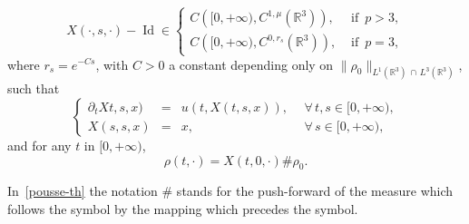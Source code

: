 \documentclass[AHL,Unicode,longabstracts,published]{cedram}
\newcommand{\R}{\mathbb{R}}
\newcommand{\Id}{\operatorname{Id}}
\let\oldforall\forall
\renewcommand*{\forall}{\mathrel{\oldforall}}
\begin{document}
\begin{theo}
\begin{equation}\label{uflox}
X(\cdot,s,\cdot)-\Id \in
\begin{cases}
C\left([0,+\infty), C^{1,\mu} \left(\R^3\right)\right), & \text{ if } \, p > 3,
\\ {C\left([0,+\infty), C^{0,r_s} \left(\R^3\right)\right),} & \text{ if } \, p =3,
\end{cases}
\end{equation}
where $r_s = e^{-Cs} $, with $C>0$ a constant depending only on $\|\rho_0\|_{L^1(\R^3)\,\cap\,L^3(\R^3)}$, such that
\begin{equation}\label{cflow-def}
\left \{
\begin{array}{rcll}
\partial_t Xt,s,x) & = & u(t, X(t,s,x)),&\: \: \forall \, t,s\in[0,+\infty), \\
X(s,s,x) & = & x,& \: \: \forall \, s \in [0,+\infty),
\end{array}
\right.
\end{equation}
and for any $t$ in $[0,+\infty)$,
\begin{equation}\label{pousse-th}
\rho(t,\cdot) =X(t,0,\cdot) \#\rho_0.
\end{equation}
\end{theo}

In~\eqref{pousse-th} the notation $\#$ stands for the push-forward of the measure which follows the symbol by the mapping which precedes the symbol.
\end{document}
